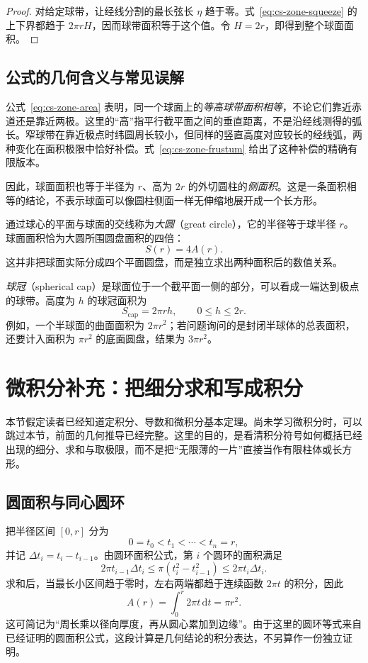 \documentclass[UTF8,12pt,a4paper,fontset=fandol]{ctexart}
\begin{document}
\begin{proof}
对给定球带，让经线分割的最长弦长 $\eta$ 趋于零。式~\eqref{eq:cs-zone-squeeze} 的上下界都趋于 $2\pi rH$，因而球带面积等于这个值。令 $H=2r$，即得到整个球面面积。
\end{proof}

\subsection{公式的几何含义与常见误解}

公式~\eqref{eq:cs-zone-area} 表明，同一个球面上的\emph{等高球带面积相等}，不论它们靠近赤道还是靠近两极。这里的“高”指平行截平面之间的垂直距离，不是沿经线测得的弧长。窄球带在靠近极点时纬圆周长较小，但同样的竖直高度对应较长的经线弧，两种变化在面积极限中恰好补偿。式~\eqref{eq:cs-zone-frustum} 给出了这种补偿的精确有限版本。

因此，球面面积也等于半径为 $r$、高为 $2r$ 的外切圆柱的\emph{侧面积}。这是一条面积相等的结论，不表示球面可以像圆柱侧面一样无伸缩地展开成一个长方形。

通过球心的平面与球面的交线称为\emph{大圆}（great circle），它的半径等于球半径 $r$。球面面积恰为大圆所围圆盘面积的四倍：
\[
  S(r)=4A(r).
\]
这并非把球面实际分成四个平面圆盘，而是独立求出两种面积后的数值关系。

\emph{球冠}（spherical cap）是球面位于一个截平面一侧的部分，可以看成一端达到极点的球带。高度为 $h$ 的球冠面积为
\begin{equation}\label{eq:cs-cap-area}
  S_{\mathrm{cap}}=2\pi rh,\qquad 0\leq h\leq2r.
\end{equation}
例如，一个半球面的曲面面积为 $2\pi r^2$；若问题询问的是封闭半球体的总表面积，还要计入面积为 $\pi r^2$ 的底面圆盘，结果为 $3\pi r^2$。

\section{微积分补充：把细分求和写成积分}
\label{sec:cs-calculus}

本节假定读者已经知道定积分、导数和微积分基本定理。尚未学习微积分时，可以跳过本节，前面的几何推导已经完整。这里的目的，是看清积分符号如何概括已经出现的细分、求和与取极限，而不是把“无限薄的一片”直接当作有限柱体或长方形。

\subsection{圆面积与同心圆环}

把半径区间 $[0,r]$ 分为
\[
  0=t_0<t_1<\cdots<t_n=r,
\]
并记 $\Delta t_i=t_i-t_{i-1}$。由圆环面积公式，第 $i$ 个圆环的面积满足
\[
  2\pi t_{i-1}\Delta t_i
  \leq\pi(t_i^2-t_{i-1}^2)
  \leq2\pi t_i\Delta t_i.
\]
求和后，当最长小区间趋于零时，左右两端都趋于连续函数 $2\pi t$ 的积分，因此
\begin{equation}\label{eq:cs-area-integral}
  A(r)=\int_0^r2\pi t\,\mathrm{d}t=\pi r^2.
\end{equation}
这可简记为“周长乘以径向厚度，再从圆心累加到边缘”。由于这里的圆环等式来自已经证明的圆面积公式，这段计算是几何结论的积分表达，不另算作一份独立证明。
\end{document}

